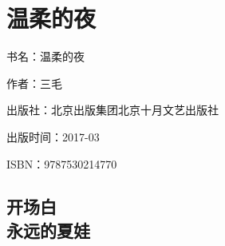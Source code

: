 

\section{温柔的夜}

\par 书名：温柔的夜
\par 作者：三毛
\par 出版社：北京出版集团北京十月文艺出版社
\par 出版时间：2017-03
\par ISBN：9787530214770

\subsection{开场白\\\small{永远的夏娃}}

